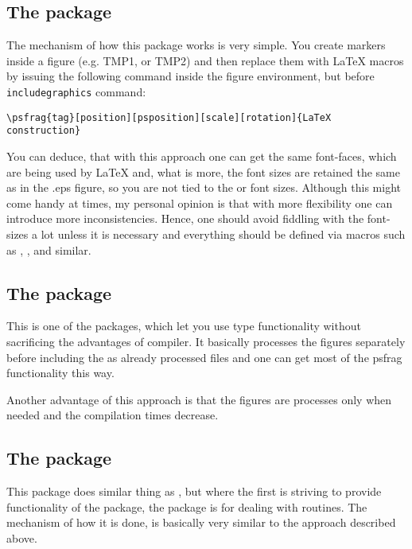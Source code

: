\documentclass[
]{scrartcl}
\begin{document}

%
\subsection{The  package}

%
The mechanism of how this package works is very simple.
%
You create markers inside a  figure (e.g. TMP1, or TMP2) and then
    replace them with \LaTeX{} macros by issuing the following command inside
    the figure environment, but before \verb|includegraphics| command:
%
\begin{lstlisting}
\psfrag{tag}[position][psposition][scale][rotation]{LaTeX construction}
\end{lstlisting}

%
You can deduce, that with this approach one can get the same font-faces, which
    are being used by \LaTeX{} and, what is more, the font sizes are retained
    the same as in the .eps figure, so you are not tied to the 
    or  font sizes.
%
Although this might come handy at times, my personal opinion is that with more
    flexibility one can introduce more inconsistencies.
%
Hence, one should avoid fiddling with the font-sizes a lot unless it is
    necessary and everything should be defined via macros such as
    , ,  and similar.

%
\subsection{The  package}

%
This is one of the packages, which let you use  type functionality
    without sacrificing the advantages of  compiler.
%
It basically processes the figures separately before including the as already
    processed  files and one can get most of the psfrag functionality
    this way.

%
Another advantage of this approach is that the figures are processes only when
    needed and the compilation times decrease.

%
\subsection{The  package}

%
This package does similar thing as , but where the first is striving
    to provide functionality of the  package, the 
    package is for dealing with  routines.
%
The mechanism of how it is done, is basically very similar to the approach
    described above.


\end{document}
